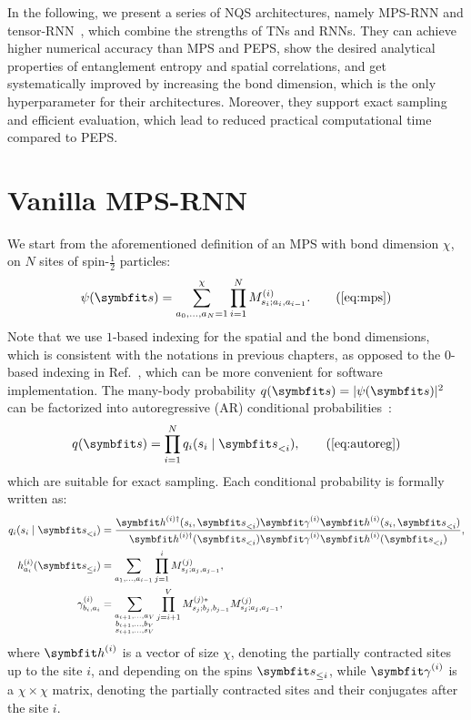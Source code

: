 In the following, we present a series of NQS architectures, namely MPS-RNN and tensor-RNN~\cite{wu2023tensor}, which combine the strengths of TNs and RNNs. They can achieve higher numerical accuracy than MPS and PEPS, show the desired analytical properties of entanglement entropy and spatial correlations, and get systematically improved by increasing the bond dimension, which is the only hyperparameter for their architectures. Moreover, they support exact sampling and efficient evaluation, which lead to reduced practical computational time compared to PEPS.

\section{Vanilla MPS-RNN}

We start from the aforementioned definition of an MPS with bond dimension $\chi$, on $N$ sites of spin-$\frac{1}{2}$ particles:
\begin{equation}
\psi(\vs) = \sum_{a_0, \ldots, a_N = 1}^\chi \prod_{i = 1}^N M^{(i)}_{s_i; a_i, a_{i - 1}}.
\tag{\ref{eq:mps}}
\end{equation}
Note that we use $1$-based indexing for the spatial and the bond dimensions, which is consistent with the notations in previous chapters, as opposed to the $0$-based indexing in Ref.~\cite{wu2023tensor}, which can be more convenient for software implementation. The many-body probability $q(\vs) = |\psi(\vs)|^2$ can be factorized into autoregressive (AR) conditional probabilities~\cite{ferris2012perfect, han2018unsupervised, wei2022sequential}:
\begin{equation}
q(\vs) = \prod_{i = 1}^N q_i(s_i \mid \vs_{< i}),
\tag{\ref{eq:autoreg}}
\end{equation}
which are suitable for exact sampling. Each conditional probability is formally written as:
\begin{align}
q_i(s_i \mid \vs_{< i}) &= \frac
{\vh^{(i) \dagger}(s_i, \vs_{< i}) \mga^{(i)} \vh^{(i)}(s_i, \vs_{< i})}
{\vh^{(i) \dagger}(\vs_{< i}) \mga^{(i)} \vh^{(i)}(\vs_{< i})}, \label{eq:mps-cond-prob} \\
h^{(i)}_{a_i}(\vs_{\le i}) &=
\sum_{a_1, \ldots, a_{i - 1}}
\prod_{j = 1}^i M^{(j)}_{s_j; a_j, a_{j - 1}}, \\
\gamma^{(i)}_{b_i, a_i} &=
\sum_{\substack{a_{i + 1}, \ldots, a_V \\ b_{i + 1}, \ldots, b_V \\ s_{i + 1}, \ldots, s_V}}
\prod_{j = i + 1}^V M^{(j) *}_{s_j; b_j, b_{j - 1}} M^{(j)}_{s_j; a_j, a_{j - 1}},
\end{align}
where $\vh^{(i)}$ is a vector of size $\chi$, denoting the partially contracted sites up to the site $i$, and depending on the spins $\vs_{\le i}$, while $\mga^{(i)}$ is a $\chi \times \chi$ matrix, denoting the partially contracted sites and their conjugates after the site $i$.

